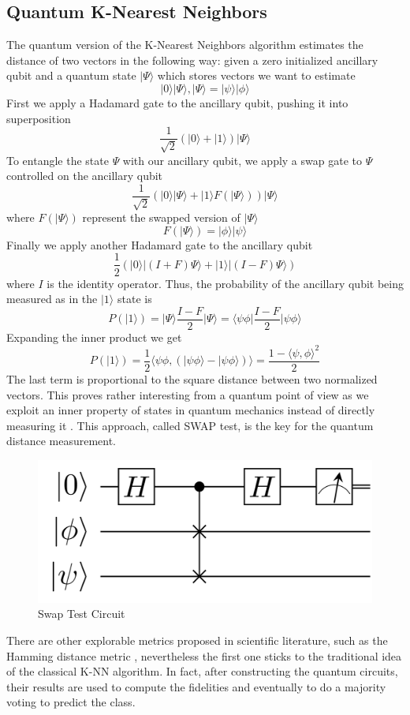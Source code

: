 \documentclass{article}
\begin{document}
\begin{multicols}{2}
\subsection{Quantum K-Nearest Neighbors}
The quantum version of the K-Nearest Neighbors algorithm estimates the distance of two vectors in the following way:
given a zero initialized ancillary qubit and a quantum state \(\lvert \Psi\rangle\) which stores vectors we want to estimate
$$ \lvert 0\rangle\lvert\Psi\rangle , \lvert \Psi\rangle = \lvert \psi \rangle\lvert \phi \rangle$$
First we apply a Hadamard gate to the ancillary qubit, pushing it into superposition
$$ \frac{1}{\sqrt{2}}(\lvert 0\rangle + \lvert 1\rangle)\lvert \Psi\rangle $$
To entangle the state \(\Psi\) with our ancillary qubit, we apply a swap gate to \(\Psi\) controlled on the ancillary qubit
$$ \frac{1}{\sqrt{2}}(\lvert 0\rangle \lvert \Psi\rangle + \lvert 1\rangle F(\lvert \Psi\rangle))\lvert \Psi\rangle $$
where \(F(\lvert \Psi\rangle)\) represent the swapped version of \(\lvert \Psi\rangle\)
$$F(\lvert \Psi\rangle) = \lvert \phi\rangle \lvert \psi\rangle $$
Finally we apply another Hadamard gate to the ancillary qubit
$$ \frac{1}{2}(\lvert 0\rangle \lvert (I + F)\Psi\rangle + \lvert 1\rangle \lvert(I - F)\Psi\rangle) $$
where $I$ is the identity operator.
Thus, the probability of the ancillary qubit being measured as in the \(\lvert 1\rangle\) state is 
$$ P(\lvert 1\rangle) = \lvert \Psi\rangle \frac{I-F}{2} \lvert \Psi\rangle = \langle \psi\phi\lvert \frac{I-F}{2} \lvert \psi\phi\rangle $$
Expanding the inner product we get
$$ P(\lvert 1\rangle) = \frac{1}{2}\langle \psi\phi, (\lvert \psi\phi\rangle - \lvert \psi\phi \rangle) \rangle  = \frac{1 - \langle \psi, \phi \rangle ^2}{2}$$
The last term is proportional to the square distance between two normalized vectors.
This proves rather interesting from a quantum point of view as we exploit an inner property of states in quantum mechanics instead of directly measuring it \cite{Basheer2020-ww}. This approach, called SWAP test, is the key for the quantum distance measurement.
\begin{figure}[H]
  \centering
    \includegraphics[width=.8\linewidth]{assets/kmeans/Quantum-swap-test-circuit-correct.png}
    \caption{Swap Test Circuit}
\end{figure}
There are other explorable metrics proposed in scientific literature, such as the Hamming distance metric \cite{Li2021-le}, nevertheless the first one sticks to the traditional idea of the classical K-NN algorithm. In fact, after constructing the quantum circuits, their results are used to compute the fidelities and eventually to do a majority voting to predict the class. 


\end{multicols}
\end{document}
